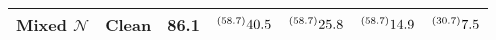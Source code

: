\begin{table*}[t]
\begin{tabular}{cc|c|cccc}
    Mixed $\mathcal{N}$                    & Clean                      & 86.1  &  $ \prescript{(58.7)}{}{40.5}$   &   $ \prescript{(58.7)}{}{25.8}$     &    $ \prescript{(58.7)}{}{14.9}$    &   $ \prescript{(30.7)}{}{7.5}$      \\ \hline
    \end{tabular}
\end{table*}



